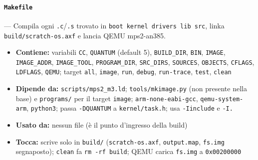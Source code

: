 \paragraph{\texttt{Makefile}} --- Compila ogni \texttt{.c}/\texttt{.s} trovato in \texttt{boot kernel drivers lib src}, linka \texttt{build/scratch-os.axf} e lancia QEMU mps2-an385.
\begin{itemize}
  \item \textbf{Contiene:} variabili \texttt{CC}, \texttt{QUANTUM} (default 5), \texttt{BUILD\_DIR}, \texttt{BIN}, \texttt{IMAGE}, \texttt{IMAGE\_ADDR}, \texttt{IMAGE\_TOOL}, \texttt{PROGRAM\_DIR}, \texttt{SRC\_DIRS}, \texttt{SOURCES}, \texttt{OBJECTS}, \texttt{CFLAGS}, \texttt{LDFLAGS}, \texttt{QEMU}; target \texttt{all}, \texttt{image}, \texttt{run}, \texttt{debug}, \texttt{run-trace}, \texttt{test}, \texttt{clean}
  \item \textbf{Dipende da:} \texttt{scripts/mps2\_m3.ld}; \texttt{tools/mkimage.py} (non presente nella base) e \texttt{programs/} per il target \texttt{image}; \texttt{arm-none-eabi-gcc}, \texttt{qemu-system-arm}, \texttt{python3}; passa \texttt{-DQUANTUM} a \texttt{kernel/task.h}; usa \texttt{-Iinclude} e \texttt{-I.}
  \item \textbf{Usato da:} nessun file (è il punto d'ingresso della build)
  \item \textbf{Tocca:} scrive solo in \texttt{build/} (\texttt{scratch-os.axf}, \texttt{output.map}, \texttt{fs.img} segnaposto); \texttt{clean} fa \texttt{rm -rf build}; QEMU carica \texttt{fs.img} a \texttt{0x00200000}
\end{itemize}

